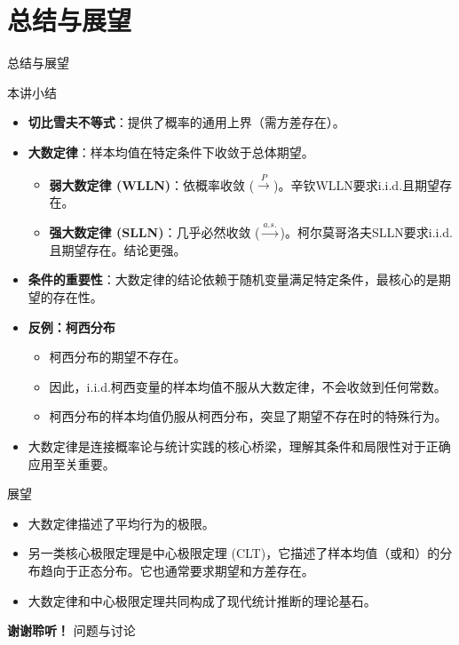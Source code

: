 \documentclass[UTF8]{beamer}
\begin{document}
\section{总结与展望}
\begin{frame}[shrink=5]{总结与展望}
    \begin{block}{本讲小结}
        \begin{itemize}
            \item \textbf{切比雪夫不等式}：提供了概率的通用上界（需方差存在）。
            \item \textbf{大数定律}：样本均值在特定条件下收敛于总体期望。
                \begin{itemize}
                    \item \textbf{弱大数定律 (WLLN)}：依概率收敛 ($\xrightarrow{P}$)。辛钦WLLN要求i.i.d.且期望存在。
                    \item \textbf{强大数定律 (SLLN)}：几乎必然收敛 ($\xrightarrow{a.s.}$)。柯尔莫哥洛夫SLLN要求i.i.d.且期望存在。结论更强。
                \end{itemize}
            \item \alert{\textbf{条件的重要性}}：大数定律的结论依赖于随机变量满足特定条件，最核心的是\alert{期望的存在性}。
            \item \alert{\textbf{反例：柯西分布}}
                \begin{itemize}
                    \item 柯西分布的期望\alert{不存在}。
                    \item 因此，i.i.d.柯西变量的样本均值\alert{不服从}大数定律，不会收敛到任何常数。
                    \item 柯西分布的样本均值\alert{仍服从}柯西分布，突显了期望不存在时的特殊行为。
                \end{itemize}
            \item 大数定律是连接概率论与统计实践的\alert{核心桥梁}，理解其条件和局限性对于正确应用至关重要。
        \end{itemize}
    \end{block}
\end{frame}

\begin{frame}
    \begin{alertblock}{展望}
        \begin{itemize}
            \item 大数定律描述了\alert{平均}行为的极限。
            \item 另一类核心极限定理是\alert{中心极限定理 (CLT)}，它描述了样本均值（或和）的\alert{分布}趋向于正态分布。它也通常要求期望和方差存在。
            \item 大数定律和中心极限定理共同构成了现代统计推断的理论基石。
        \end{itemize}
    \end{alertblock}
\end{frame}

\begin{frame}
    \centering
    \Huge{\bfseries 谢谢聆听！}
    \vspace{1cm}
    \normalsize
    问题与讨论
\end{frame}
\end{document}

